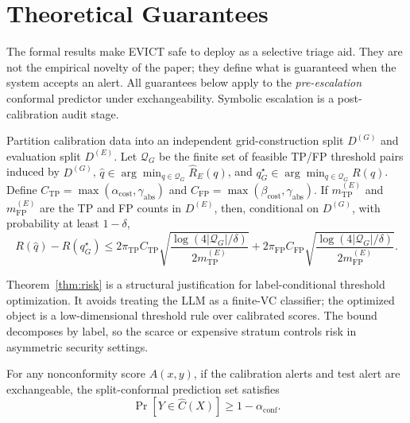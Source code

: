 \section{Theoretical Guarantees}
\label{sec:theory}

The formal results make EVICT safe to deploy as a selective triage aid. They are not the empirical novelty of the paper; they define what is guaranteed when the system accepts an alert. All guarantees below apply to the \emph{pre-escalation} conformal predictor under exchangeability. Symbolic escalation is a post-calibration audit stage.

\begin{theorem}
\label{thm:risk}
Partition calibration data into an independent grid-construction split $D^{(G)}$ and evaluation split $D^{(E)}$. Let $\mathcal Q_G$ be the finite set of feasible TP/FP threshold pairs induced by $D^{(G)}$, $\hat q\in\arg\min_{q\in\mathcal Q_G}\hat R_E(q)$, and $q_G^\star\in\arg\min_{q\in\mathcal Q_G}R(q)$. Define $C_{\mathrm{TP}}=\max(\alpha_{\mathrm{cost}},\gamma_{\mathrm{abs}})$ and $C_{\mathrm{FP}}=\max(\beta_{\mathrm{cost}},\gamma_{\mathrm{abs}})$. If $m^{(E)}_{\mathrm{TP}}$ and $m^{(E)}_{\mathrm{FP}}$ are the TP and FP counts in $D^{(E)}$, then, conditional on $D^{(G)}$, with probability at least $1-\delta$,
\begin{equation}
R(\hat q)-R(q_G^\star)\le
2\pi_{\mathrm{TP}}C_{\mathrm{TP}}\sqrt{\frac{\log(4|\mathcal Q_G|/\delta)}{2m^{(E)}_{\mathrm{TP}}}}
+2\pi_{\mathrm{FP}}C_{\mathrm{FP}}\sqrt{\frac{\log(4|\mathcal Q_G|/\delta)}{2m^{(E)}_{\mathrm{FP}}}}.
\end{equation}
\end{theorem}

Theorem~\ref{thm:risk} is a structural justification for label-conditional threshold optimization. It avoids treating the LLM as a finite-VC classifier; the optimized object is a low-dimensional threshold rule over calibrated scores. The bound decomposes by label, so the scarce or expensive stratum controls risk in asymmetric security settings.

\begin{theorem}
\label{thm:conformal}
For any nonconformity score $A(x,y)$, if the calibration alerts and test alert are exchangeable, the split-conformal prediction set satisfies
\begin{equation}
\Pr[Y\in\hat C(X)]\ge 1-\alpha_{\mathrm{conf}}.
\end{equation}
\end{theorem}

